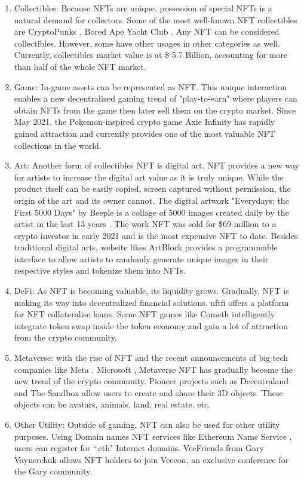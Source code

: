 \documentclass[12pt, titlepage]{article}
\begin{document}
\begin{enumerate}
\item Collectibles: Because NFTs are unique, possession of special NFTs is a natural demand for collectors. Some of the most well-known NFT collectibles are CryptoPunks \cite{cryptopunks}, Bored Ape Yacht Club \cite{bayc}. Any NFT can be considered collectibles. However, some have other usages in other categories as well. Currently, collectibles market value is at \$ 5.7 Billion, accounting for more than half of the whole NFT market.
\item Game: In-game assets can be represented as NFT. This unique interaction enables a new decentralized gaming trend of "play-to-earn" where players can obtain NFTs from the game then later sell them on the crypto market. Since May 2021, the Pokemon-inspired crypto game Axie Infinity \cite{axie} has rapidly gained attraction and currently provides one of the most valuable NFT collections in the world.
\item Art: Another form of collectibles NFT is digital art. NFT provides a new way for artists to increase the digital art value as it is truly unique. While the product itself can be easily copied, screen captured without permission, the origin of the art and its owner cannot. The digital artwork "Everydays: the First 5000 Days" by Beeple is a collage of 5000 images created daily by the artist in the last 13 years \cite{beeple}. The work NFT was sold for \$69 million to a crypto investor in early 2021 and is the most expensive NFT to date. Besides traditional digital arts, website likes ArtBlock \cite{artblock} provides a programmable interface to allow artists to randomly generate unique images in their respective styles and tokenize them into NFTs. 
\item DeFi: As NFT is becoming valuable, its liquidity grows. Gradually, NFT is making its way into decentralized financial solutions. nftfi \cite {nftfi} offers a platform for NFT collateralise loans. Some NFT games like Cometh \cite{cometh} intelligently integrate token swap inside the token economy and gain a lot of attraction from the crypto community.  
\item Metaverse: with the rise of NFT and the recent announcements of big tech companies like Meta \cite{facebook}, Microsoft \cite{microsoft}, Metaverse NFT has gradually become the new trend of the crypto community. Pioneer projects such as Decentraland \cite{decentraland} and The Sandbox \cite{sandbox} allow users to create and share their 3D objects. These objects can be avatars, animals, land, real estate, etc. 
\item Other Utility: Outside of gaming, NFT can also be used for other utility purposes. Using Domain names NFT services like Ethereum Name Service \cite{ens}, users can register for ``.eth" Internet domains. VeeFriends \cite{vee} from Gary Vaynerchuk allows NFT holders to join Veecon, an exclusive conference for the Gary community.
\end{enumerate}
\end{document}
